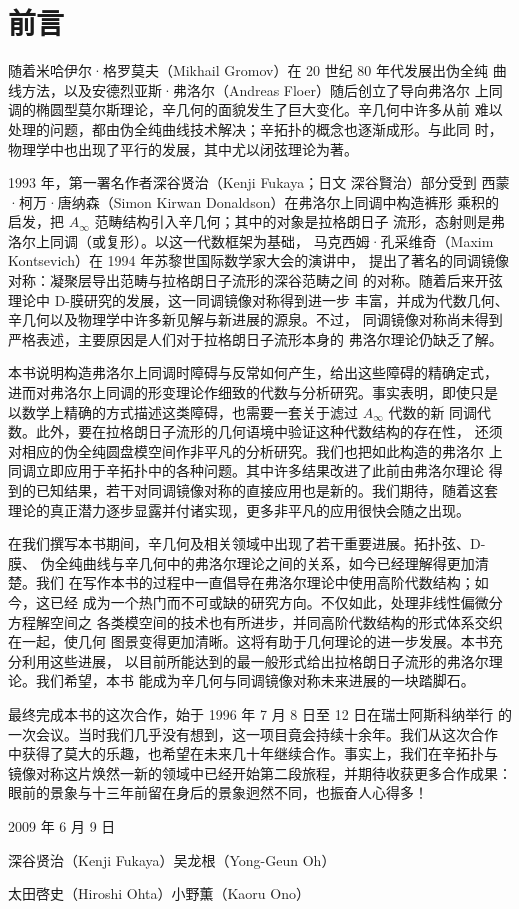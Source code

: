 
\chapter*{前言}

随着米哈伊尔·格罗莫夫（Mikhail Gromov）在 20 世纪 80 年代发展出伪全纯
曲线方法，以及安德烈亚斯·弗洛尔（Andreas Floer）随后创立了导向弗洛尔
上同调的椭圆型莫尔斯理论，辛几何的面貌发生了巨大变化。辛几何中许多从前
难以处理的问题，都由伪全纯曲线技术解决；辛拓扑的概念也逐渐成形。与此同
时，物理学中也出现了平行的发展，其中尤以闭弦理论为著。

1993 年，第一署名作者深谷贤治（Kenji Fukaya；日文 深谷賢治）部分受到
西蒙·柯万·唐纳森（Simon Kirwan Donaldson）在弗洛尔上同调中构造裤形
乘积的启发，把 $A_\infty$ 范畴结构引入辛几何；其中的对象是拉格朗日子
流形，态射则是弗洛尔上同调（或复形）。以这一代数框架为基础，
马克西姆·孔采维奇（Maxim Kontsevich）在 1994 年苏黎世国际数学家大会的演讲中，
提出了著名的同调镜像对称：凝聚层导出范畴与拉格朗日子流形的深谷范畴之间
的对称。随着后来开弦理论中 D-膜研究的发展，这一同调镜像对称得到进一步
丰富，并成为代数几何、辛几何以及物理学中许多新见解与新进展的源泉。不过，
同调镜像对称尚未得到严格表述，主要原因是人们对于拉格朗日子流形本身的
弗洛尔理论仍缺乏了解。

本书说明构造弗洛尔上同调时障碍与反常如何产生，给出这些障碍的精确定式，
进而对弗洛尔上同调的形变理论作细致的代数与分析研究。事实表明，即使只是
以数学上精确的方式描述这类障碍，也需要一套关于滤过 $A_\infty$ 代数的新
同调代数。此外，要在拉格朗日子流形的几何语境中验证这种代数结构的存在性，
还须对相应的伪全纯圆盘模空间作非平凡的分析研究。我们也把如此构造的弗洛尔
上同调立即应用于辛拓扑中的各种问题。其中许多结果改进了此前由弗洛尔理论
得到的已知结果，若干对同调镜像对称的直接应用也是新的。我们期待，随着这套
理论的真正潜力逐步显露并付诸实现，更多非平凡的应用很快会随之出现。

在我们撰写本书期间，辛几何及相关领域中出现了若干重要进展。拓扑弦、D-膜、
伪全纯曲线与辛几何中的弗洛尔理论之间的关系，如今已经理解得更加清楚。我们
在写作本书的过程中一直倡导在弗洛尔理论中使用高阶代数结构；如今，这已经
成为一个热门而不可或缺的研究方向。不仅如此，处理非线性偏微分方程解空间之
各类模空间的技术也有所进步，并同高阶代数结构的形式体系交织在一起，使几何
图景变得更加清晰。这将有助于几何理论的进一步发展。本书充分利用这些进展，
以目前所能达到的最一般形式给出拉格朗日子流形的弗洛尔理论。我们希望，本书
能成为辛几何与同调镜像对称未来进展的一块踏脚石。

最终完成本书的这次合作，始于 1996 年 7 月 8 日至 12 日在瑞士阿斯科纳举行
的一次会议。当时我们几乎没有想到，这一项目竟会持续十余年。我们从这次合作
中获得了莫大的乐趣，也希望在未来几十年继续合作。事实上，我们在辛拓扑与
镜像对称这片焕然一新的领域中已经开始第二段旅程，并期待收获更多合作成果：
眼前的景象与十三年前留在身后的景象迥然不同，也振奋人心得多！

\begin{flushright}
2009 年 6 月 9 日\par
深谷贤治（Kenji Fukaya）\quad 吴龙根（Yong-Geun Oh）\par
太田啓史（Hiroshi Ohta）\quad 小野薫（Kaoru Ono）
\end{flushright}
